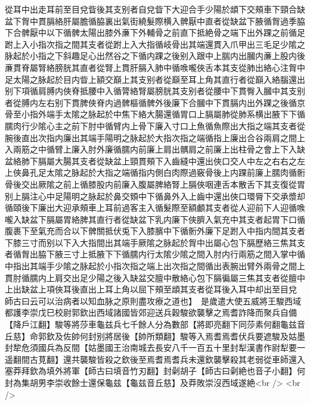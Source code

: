從耳中出走耳前至目兌眥後其支别者自兌眥下大迎合手少陽於䪼下交頰車下頸合缺盆下胷中貫膈絡肝屬膽循脇裏出氣街繞髮際横入髀厭中直者從缺盆下腋循胷過季脇下合髀厭中以下循髀太陽出膝外亷下外輔骨之前直下抵絶骨之端下出外踝之前循足跗上入小指次指之間其支者從跗上入大指循岐骨出其端還貫入爪甲出三毛足少隂之脉起於小指之下斜趣足心出然谷之下循内踝之後别入跟中上腨内出膕内亷上股内後亷貫脊屬腎絡膀胱其直者從腎上貫肝膈入肺中循㗋嚨俠舌本其支從肺出絡心注胷中足太陽之脉起於目内眥上額交巔上其支别者從巔至耳上角其直行者從巔入絡腦還出别下項循肩膊内俠脊抵腰中入循膂絡腎屬膀胱其支别者從腰中下貫臀入膕中其支别者從膊内左右别下貫脾俠脊内過髀樞循髀外後廉下合膕中下貫膈内出外踝之後循京骨至小指外端手太隂之脉起於中焦下絡大腸還循胃口上膈屬肺從肺系横出腋下下循臑肉行少隂心主之前下肘中循臂内上骨下廉入寸口上魚循魚際出大指之端其支者從腕後直出次指内廉出其端手陽明之脉起於大指次指之端循指上廉出合谷兩肩之間上入兩筋之中循臂上廉入肘外廉循臑内前廉上肩出髃肩之前廉上出柱骨之會上下入缺盆絡肺下膈屬大腸其支者從缺盆上頸貫頰下入齒縫中還出俠口交人中左之右右之左上俠鼻孔足太隂之脉起於大指之端循指内側白肉際過竅骨後上内踝前廉上臑肉循䯒骨後交出厥隂之前上循膝股内前廉入腹屬脾絡腎上膈俠咽連舌本散舌下其支復從胃别上膈注心中足陽明之脉起於鼻交頞中下循鼻外入上齒中還出俠口環脣下交承漿却循頤後下廉出大迎承頰車上耳前過客主入循髮際至額顱其支者從人迎前下人迎循㗋嚨入缺盆下膈屬胃絡脾其直行者從缺盆下乳内廉下俠臍入氣充中其支者起胃下口循腹裹下至氣充而合以下髀關抵伏兎下入膝臏中下循䯒外廉下足跗入中指内間其支者下膝三寸而别以下入大指間出其端手厥隂之脉起於胷中出屬心包下膈歷絡三焦其支者循胷出脇下腋三寸上抵腋下下循臑内行太隂少隂之間入肘内行兩筋之間入掌中循中指出其端手少隂之脉起於小指次指之端上出次指之間循出表腕出臂外兩骨之間上貫肘循臑内上肩交出足少陽之後入缺盆交膻中散絡心包下膈徧屬三焦其支者從膻中上出缺盆上項俠耳後直出上耳上角以屈下頰至䪼其支者從耳後入耳中却出至目兌師古曰云可以治病者以知血脉之原則盡攻療之道也】　是歲遣大使五威將王駿西域都護李崇戊巳校尉郭欽出西域諸國皆郊迎送兵穀駿欲襲擊之焉耆詐降而聚兵自備【降戶江翻】駿等將莎車龜兹兵七千餘人分為數部【將即亮翻下同莎素何翻龜兹音丘慈】命郭欽及佐帥何封别將居後【帥所類翻】駿等入焉耆焉耆伏兵要遮駿及姑墨封犂危須國兵為反間【姑墨國王治南城去長安八千一百五十里封犁漢書作尉犁要一遥翻間古莧翻】還共襲駿皆殺之欽後至焉耆焉耆兵未還欽襲擊殺其老弱從車師還入塞莽拜欽為填外將軍【師古曰填音竹刃翻】封劋胡子【師古曰劋絶也音子小翻】何封為集胡男李崇收餘士還保龜兹【龜兹音丘慈】及莽敗崇沒西域遂絶<br />
<br />
